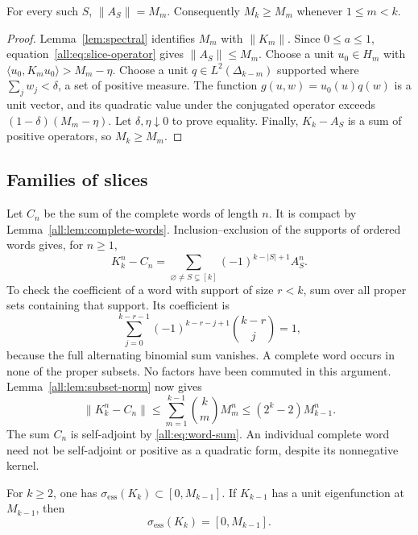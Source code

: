 \documentclass[11pt]{article}
\begin{document}
\begin{lemma}\label{all:lem:subset-norm}
For every such $S$, $\|A_S\|=M_m$.
Consequently $M_k\geq M_m$ whenever $1\leq m<k$.
\end{lemma}

\begin{proof}
Lemma~\ref{lem:spectral} identifies $M_m$ with $\|K_m\|$.
Since $0\leq a\leq1$, equation~\eqref{all:eq:slice-operator} gives
$\|A_S\|\leq M_m$.
Choose a unit $u_0\in H_m$ with
$\langle u_0,K_mu_0\rangle>M_m-\eta$.
Choose a unit $q\in L^2(\Delta_{k-m})$ supported where
$\sum_jw_j<\delta$, a set of positive measure.
The function $g(u,w)=u_0(u)q(w)$ is a unit vector, and its quadratic value
under the conjugated operator exceeds $(1-\delta)(M_m-\eta)$.
Let $\delta,\eta\downarrow0$ to prove equality.
Finally, $K_k-A_S$ is a sum of positive operators, so $M_k\geq M_m$.
\end{proof}

\subsection{Families of slices}

Let $C_n$ be the sum of the complete words of length $n$.
It is compact by Lemma~\ref{all:lem:complete-words}.
Inclusion--exclusion of the supports of ordered words gives, for $n\geq1$,
\begin{equation}\label{all:eq:word-sum}
 K_k^n-C_n
 =\sum_{\varnothing\ne S\subsetneq[k]}(-1)^{k-|S|+1}A_S^n.
\end{equation}
To check the coefficient of a word with support of size $r<k$, sum over
all proper sets containing that support.  Its coefficient is
\[
 \sum_{j=0}^{k-r-1}(-1)^{k-r-j+1}\binom{k-r}{j}=1,
\]
because the full alternating binomial sum vanishes.
A complete word occurs in none of the proper subsets.
No factors have been commuted in this argument.
Lemma~\ref{all:lem:subset-norm} now gives
\begin{equation}\label{all:eq:essential-bound}
 \|K_k^n-C_n\|
 \leq\sum_{m=1}^{k-1}\binom{k}{m}M_m^n
 \leq(2^k-2)M_{k-1}^n.
\end{equation}
The sum $C_n$ is self-adjoint by \eqref{all:eq:word-sum}.
An individual complete word need not be self-adjoint or positive as a
quadratic form, despite its nonnegative kernel.

\begin{proposition}\label{all:prop:essential}
For $k\geq2$, one has $\sigma_{\mathrm{ess}}(K_k)\subset[0,M_{k-1}]$.
If $K_{k-1}$ has a unit eigenfunction at $M_{k-1}$, then
\[
                    \sigma_{\mathrm{ess}}(K_k)=[0,M_{k-1}].
\]
\end{proposition}
\end{document}
